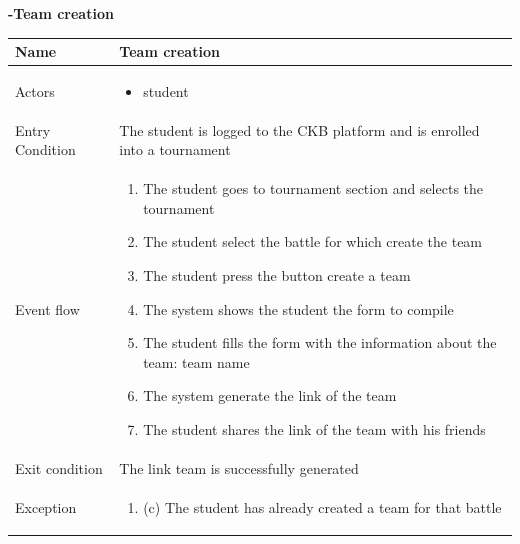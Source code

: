 \begin{enumerate}[label=\textbf{[UC\arabic*]}]
\newpage
\item  \textbf{-Team creation}
    \\ \begin{tabular}{|l|p{11cm}|}
        \hline
        Name & Team creation \\
        \hline
        Actors & \begin{itemize}
                    \item student
                \end{itemize} \\
        \hline
        Entry Condition & The student is logged to the CKB platform and is enrolled into a tournament\\
        \hline
        Event flow & \begin{enumerate}
            \item The student goes to tournament section and selects the tournament
            \item The student select the battle for which create the team
            \item The student press the button create a team
            \item The system shows the student the form to compile
            \item The student fills the form with the information about the team: team name
            \item The system generate the link of the team 
            \item The student shares the link of the team with his friends
        \end{enumerate}\\
        \hline
        Exit condition &  The link team is successfully generated \\
        \hline
        Exception & \begin{enumerate} [label={}, leftmargin=0.25cm ]
            \item (c) The student has already created a team for that battle
        \end{enumerate} \\
        \hline            
    \end{tabular}


\end{enumerate}
